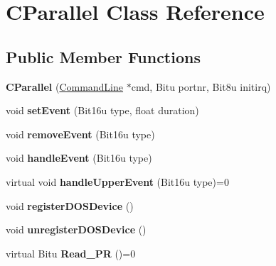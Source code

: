 \hypertarget{classCParallel}{\section{C\-Parallel Class Reference}
\label{classCParallel}
}
\subsection*{Public Member Functions}
\begin{DoxyCompactItemize}
\item 
\hypertarget{classCParallel_acf40d6322cbb27b3dbdadb98f5b85d8a}{{\bfseries C\-Parallel} (\hyperlink{classCommandLine}{Command\-Line} $\ast$cmd, Bitu portnr, Bit8u initirq)}\label{classCParallel_acf40d6322cbb27b3dbdadb98f5b85d8a}

\item 
\hypertarget{classCParallel_abf2ac9e3a37c8c0d0e04c42b85353ff8}{void {\bfseries set\-Event} (Bit16u type, float duration)}\label{classCParallel_abf2ac9e3a37c8c0d0e04c42b85353ff8}

\item 
\hypertarget{classCParallel_ae8b1a2d75783b8910371658d2784e150}{void {\bfseries remove\-Event} (Bit16u type)}\label{classCParallel_ae8b1a2d75783b8910371658d2784e150}

\item 
\hypertarget{classCParallel_a2f7e311564f795b2b7e80f131e94df8a}{void {\bfseries handle\-Event} (Bit16u type)}\label{classCParallel_a2f7e311564f795b2b7e80f131e94df8a}

\item 
\hypertarget{classCParallel_a7b4408fa33daf8df3d4a8ef800966e03}{virtual void {\bfseries handle\-Upper\-Event} (Bit16u type)=0}\label{classCParallel_a7b4408fa33daf8df3d4a8ef800966e03}

\item 
\hypertarget{classCParallel_a423399d97f72d64a7dc428a34f89a8c6}{void {\bfseries register\-D\-O\-S\-Device} ()}\label{classCParallel_a423399d97f72d64a7dc428a34f89a8c6}

\item 
\hypertarget{classCParallel_a1f7db7d51592a4053ac68aacee0d57aa}{void {\bfseries unregister\-D\-O\-S\-Device} ()}\label{classCParallel_a1f7db7d51592a4053ac68aacee0d57aa}

\item 
\hypertarget{classCParallel_a0d3e8a0777483495a14153fadcab6544}{virtual Bitu {\bfseries Read\-\_\-\-P\-R} ()=0}\label{classCParallel_a0d3e8a0777483495a14153fadcab6544}


\end{DoxyCompactItemize}
